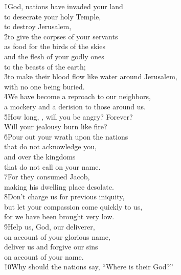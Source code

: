 \begin{poetry}
\poeml \v{1}God, nations have invaded your land \\
\poemll    to desecrate your holy Temple, \\
\poemlll       to destroy Jerusalem, \\
\poeml \v{2}to give the corpses of your servants \\
\poemll    as food for the birds of the skies \\
\poeml and the flesh of your godly ones \\
\poemll    to the beasts of the earth; \\
\poeml \v{3}to make their blood flow like water around Jerusalem, \\
\poemll    with no one being buried. \\
\poeml \v{4}We have become a reproach to our neighbors, \\
\poemll    a mockery and a derision to those around us. \\
\poeml \v{5}How long, , will you be angry? Forever? \\
\poemll    Will your jealousy burn like fire? \\
\poeml \v{6}Pour out your wrath upon the nations \\
\poemll    that do not acknowledge you, \\
\poeml and over the kingdoms \\
\poemll    that do not call on your name. \\
\poemll    \v{7}For they consumed Jacob, \\
\poemll    making his dwelling place desolate. \\
\poeml \v{8}Don't charge us for previous iniquity, \\
\poemll    but let your compassion come quickly to us, \\
\poemlll       for we have been brought very low. \\
\poeml \v{9}Help us, God, our deliverer, \\
\poemll    on account of your glorious name, \\
\poeml deliver us and forgive our sins \\
\poemll    on account of your name. \\
\poeml \v{10}Why should the nations say, ``Where is their God?'' \\

\end{poetry}
